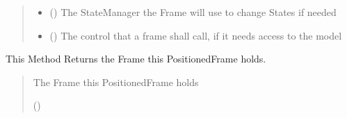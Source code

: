 \documentclass[letterpaper,10pt,english]{sphinxmanual}
\begin{document}
\begin{fulllineitems}
\begin{fulllineitems}
\begin{quote}
\begin{description}
\begin{itemize}
\item {} 
\sphinxAtStartPar
{} ({\hyperref[\detokenize{apidoc/src.osm_configurator.view.states:src.osm_configurator.view.states.state_manager.StateManager}]{}}) \textendash{} The StateManager the Frame will use to change States if needed

\item {} 
\sphinxAtStartPar
{} ({\hyperref[\detokenize{apidoc/src.osm_configurator.control:src.osm_configurator.control.control_interface.IControl}]{}}) \textendash{} The control that a frame shall call, if it needs access to the model

\end{itemize}

\end{description}\end{quote}

\end{fulllineitems}


\begin{fulllineitems}
\label{\detokenize{apidoc/src.osm_configurator.view.states:src.osm_configurator.view.states.positioned_frame.PositionedFrame.get_frame}}
\pysigstartsignatures
{}
\pysigstopsignatures
\sphinxAtStartPar
This Method Returns the Frame this PositionedFrame holds.
\begin{quote}\begin{description}
\sphinxAtStartPar
The Frame this PositionedFrame holds

\sphinxAtStartPar
({\hyperref[\detokenize{apidoc/src.osm_configurator.view.toplevelframes:src.osm_configurator.view.toplevelframes.top_level_frame.TopLevelFrame}]{}})

\end{description}\end{quote}

\end{fulllineitems}



\end{fulllineitems}
\end{document}
